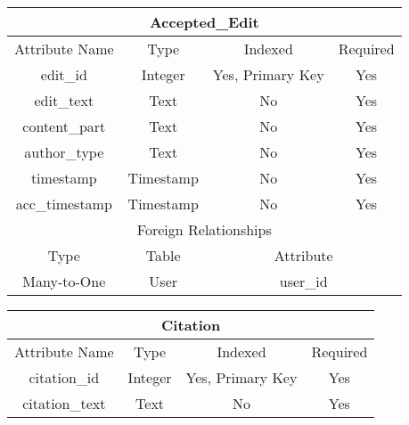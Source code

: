 \documentclass[12pt,letterpaper]{article}
\begin{document}
\vspace*{.6cm}
\begin{center}
\label{AcceptedEdit}
\begin{tabular}{|c|c|c|c|}
\hline
\multicolumn{4}{|c|}{Accepted\_Edit} \\ \hline
Attribute Name & Type & Indexed & Required \\ \hline
edit\_id & Integer & Yes, Primary Key & Yes \\ \hline
edit\_text & Text & No & Yes \\ \hline
content\_part & Text & No & Yes \\ \hline
author\_type & Text & No & Yes \\ \hline %
timestamp & Timestamp & No & Yes \\ \hline
acc\_timestamp & Timestamp & No & Yes \\ \hline
\multicolumn{4}{|c|}{Foreign Relationships} \\ \hline
Type & Table & \multicolumn{2}{c|}{Attribute} \\ \hline
Many-to-One & User & \multicolumn{2}{c|}{user\_id} \\ \hline %
\end{tabular}
\end{center}


\begin{center}
\label{Citation}
\begin{tabular}{|c|c|c|c|}
\hline
\multicolumn{4}{|c|}{Citation} \\ \hline
Attribute Name & Type & Indexed & Required \\ \hline
citation\_id & Integer & Yes, Primary Key & Yes \\ \hline
citation\_text & Text & No & Yes \\ \hline
\end{tabular}
\end{center}
\end{document}
